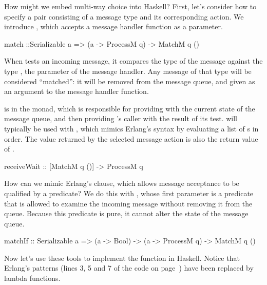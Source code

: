 \documentclass{sigplanconf}
\begin{document}
How might we embed multi-way choice into Haskell?
First, let's consider how to specify a pair consisting of a message type and its corresponding action. We introduce , which accepts a message handler function as a parameter.

\begin{code}
match ::Serializable a => (a -> ProcessM q) -> MatchM q ()
\end{code}
\noindent
When  tests an incoming message, it compares the type of the message against the type , the parameter of the message handler. 
Any message of that type will be considered ``matched'': 
it will be removed from the message queue, and given as an argument to the message handler function.

 is in the  monad, which is responsible for providing  with the current state of the message queue, and then providing 's caller with the result of its test.  will typically be used with , which mimics Erlang's  syntax by evaluating a list of s in order. The value returned by the selected message action is also the return value of .

\begin{code}
receiveWait :: [MatchM q ()] -> ProcessM q
\end{code}

How can we mimic Erlang's  clause, which allows message acceptance to be qualified by a predicate? 
We do this with , whose first parameter is a predicate that is allowed to examine the incoming message without removing it from the queue. Because this predicate is pure, it cannot alter the state of the message queue.

\begin{code}
matchIf :: Serializable a => (a -> Bool) -> 
								(a -> ProcessM q) -> MatchM q ()
\end{code}

Now let's use these tools to implement the  function in Haskell. 
Notice that Erlang's patterns (lines 3, 5 and 7 of the code on page~\pageref{erl_math}) have been replaced by lambda functions.

\needspace{14ex}
\end{document}
